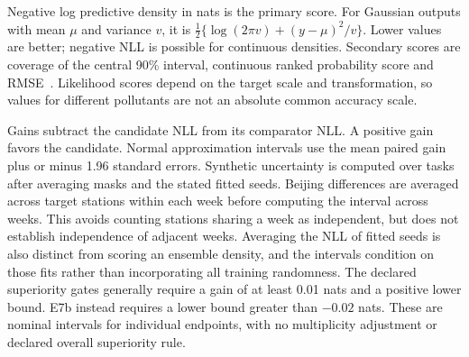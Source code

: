 Negative log predictive density in nats is the primary score. For Gaussian outputs with mean $\mu$ and variance $v$, it is $\frac12\{\log(2\pi v)+(y-\mu)^2/v\}$. Lower values are better; negative NLL is possible for continuous densities. Secondary scores are coverage of the central 90\% interval, continuous ranked probability score and RMSE~\citep{gneiting2007scoring}. Likelihood scores depend on the target scale and transformation, so values for different pollutants are not an absolute common accuracy scale.

Gains subtract the candidate NLL from its comparator NLL. A positive gain favors the candidate. Normal approximation intervals use the mean paired gain plus or minus 1.96 standard errors. Synthetic uncertainty is computed over tasks after averaging masks and the stated fitted seeds. Beijing differences are averaged across target stations within each week before computing the interval across weeks. This avoids counting stations sharing a week as independent, but does not establish independence of adjacent weeks. Averaging the NLL of fitted seeds is also distinct from scoring an ensemble density, and the intervals condition on those fits rather than incorporating all training randomness. The declared superiority gates generally require a gain of at least 0.01 nats and a positive lower bound. E7b instead requires a lower bound greater than $-0.02$ nats. These are nominal intervals for individual endpoints, with no multiplicity adjustment or declared overall superiority rule.
